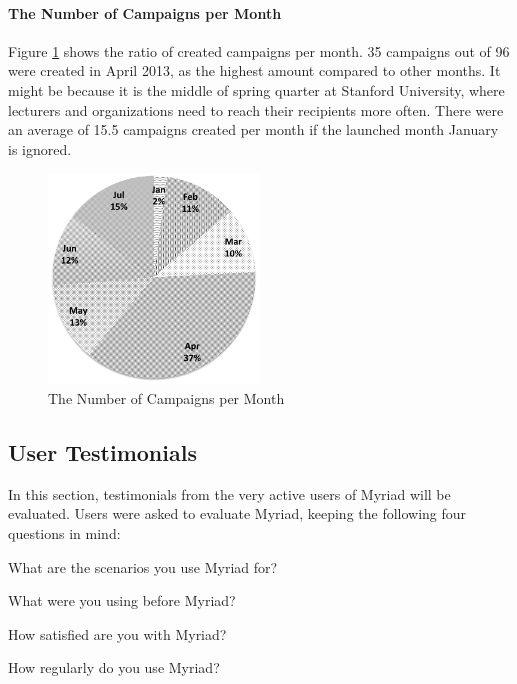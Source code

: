 \paragraph{The Number of Campaigns per Month} Figure \ref{fig:ChartCampaignsMonths} shows the ratio of created campaigns per month. 35 campaigns out of 96 were created in April 2013, as the highest amount compared to other months. It might be because it is the middle of spring quarter at Stanford University, where lecturers and organizations need to reach their recipients more often. There were an average of 15.5 campaigns created per month if the launched month January is ignored.

\begin{figure}[htbp]
	\centering
	\includegraphics[width=0.50\textwidth]{imgs/ChartCampaignsMonths.png}
	\caption[The Number of Campaigns per Month]{The Number of Campaigns per Month}
	\label{fig:ChartCampaignsMonths}
\end{figure}

\subsection{User Testimonials}
\label{subsec:5.4.2:UserTest}

In this section, testimonials from the very active users of Myriad will be evaluated. Users were asked to evaluate Myriad, keeping the following four questions in mind:

\begin{compactenum}
	\item What are the scenarios you use Myriad for?
	\item What were you using before Myriad?
	\item How satisfied are you with Myriad?
	\item How regularly do you use Myriad?
\end{compactenum}
\vspace{1cm}

